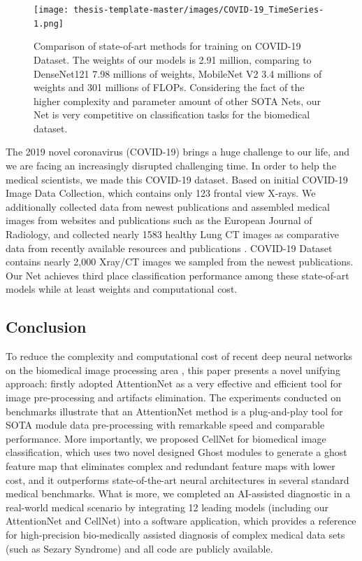 {\begin{figure}[h]
\centering
\texttt{[image: thesis-template-master/images/COVID-19\_TimeSeries-1.png]}
\label{fig}
\centering
\caption{ Comparison of state-of-art methods for training on COVID-19 Dataset.  The weights of our models is 2.91 million, comparing to DenseNet121 7.98 millions of weights, MobileNet V2 3.4 millions of weights and 301 millions of FLOPs. Considering the fact of the higher complexity and parameter amount of other SOTA Nets, our Net is very competitive on classification tasks for the biomedical dataset. }
\end{figure}

The 2019 novel coronavirus (COVID-19) brings a huge challenge to our life, and we are facing an increasingly disrupted challenging time. In order to help the medical scientists, we made this COVID-19 dataset. Based on initial COVID-19 Image Data Collection\cite{37}, which contains only 123 frontal view X-rays. We additionally collected data from newest publications and assembled medical images from websites and publications such as the European Journal of Radiology\cite{36}, and collected nearly 1583 healthy Lung CT images as comparative data from recently available resources and publications\cite{37} \cite{38}. COVID-19 Dataset contains nearly 2,000 Xray/CT images we sampled from the newest publications. Our Net achieves third place classification performance among these state-of-art models while at least weights and computational cost.




\subsection*{Conclusion}
To reduce the complexity and computational cost of recent deep neural networks on the biomedical image processing area \cite{3}\cite{15}\cite{17}, this paper presents a novel unifying approach: firstly adopted AttentionNet as a very effective and efficient tool for image pre-processing and artifacts elimination. The experiments conducted on benchmarks illustrate that an AttentionNet method is a plug-and-play tool for SOTA module data pre-processing with remarkable speed and comparable performance. More importantly, we proposed CellNet for biomedical image classification, which uses two novel designed Ghost modules to generate a ghost feature map that eliminates complex and redundant feature maps with lower cost, and it outperforms state-of-the-art neural architectures in several standard medical benchmarks.
What is more, we completed an AI-assisted diagnostic in a real-world medical scenario by integrating 12 leading models (including our AttentionNet and CellNet) into a software application, which provides a reference for high-precision bio-medically assisted diagnosis of complex medical data sets (such as Sezary Syndrome) and all code are publicly available.




}

